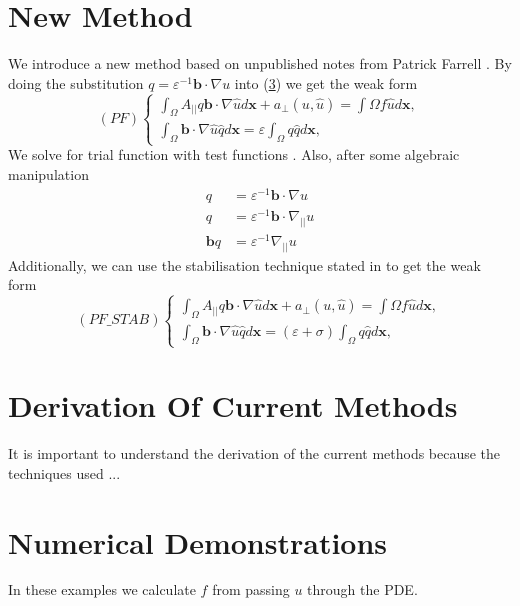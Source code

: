 \documentclass[12pt,a4paper]{article}
\begin{document}
\section{New Method}
We introduce a new method based on unpublished notes from Patrick Farrell \cite{}. 
By doing the substitution $q=\varepsilon^{-1} \mathbf{b} \cdot \nabla u$ into (\ref{}) we get the weak form
\begin{equation}
(PF)
\begin{cases}
\int_{\Omega}A_{||}q\mathbf{b} \cdot \nabla \hat{u}  d\mathbf{x} + a_{\perp}(u, \hat{u}) 
= \int{\Omega} f \hat{u} d\mathbf{x},
\\
\int_{\Omega}\mathbf{b} \cdot \nabla \hat{u}\hat{q} d\mathbf{x} 
= \varepsilon \int_{\Omega}q\hat{q} d \mathbf{x}, 
\end{cases}
\end{equation}
We solve for trial function with test functions . Also, after some algebraic manipulation 
\begin{align}
q &= \varepsilon^{-1} \mathbf{b}\cdot \nabla u\\
q &= \varepsilon^{-1} \mathbf{b} \cdot \nabla_{||} u \\
\mathbf{b}q &= \varepsilon^{-1} \nabla_{||} u 
\end{align}
Additionally, we can use the stabilisation technique stated in \cite{} to get the weak form
\begin{equation}
(PF\_STAB)
\begin{cases}
\int_{\Omega}A_{||}q\mathbf{b} \cdot \nabla \hat{u}  d\mathbf{x} + a_{\perp}(u, \hat{u}) 
= \int{\Omega} f \hat{u} d\mathbf{x},
\\
\int_{\Omega}\mathbf{b} \cdot \nabla \hat{u}\hat{q} d\mathbf{x} 
= (\varepsilon + \sigma)\int_{\Omega}q\hat{q} d \mathbf{x}, 
\end{cases}
\end{equation}

\section{Derivation Of Current Methods}
It is important to understand the derivation of the current methods because the techniques used ...



\section{Numerical Demonstrations}
In these examples we calculate $f$ from passing $u$ through the PDE.
\end{document}

